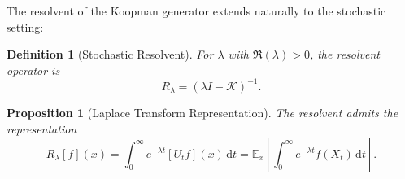 \documentclass[11pt,a4paper]{article}
\newtheorem{proposition}[theorem]{Proposition}
\newtheorem{definition}[theorem]{Definition}
\newcommand{\E}{\mathbb{E}}
\newcommand{\dt}{\,\mathrm{d}t}
\newcommand{\Koop}{\mathcal{K}}
\begin{document}
The resolvent of the Koopman generator extends naturally to the stochastic setting:

\begin{definition}[Stochastic Resolvent]\label{def:resolvent}
For $\lambda$ with $\Re(\lambda) > 0$, the resolvent operator is
\begin{equation}
R_\lambda = (\lambda I - \Koop)^{-1}.
\end{equation}
\end{definition}

\begin{proposition}[Laplace Transform Representation]\label{prop:laplace_resolvent}
The resolvent admits the representation
\begin{equation}\label{eq:resolvent_laplace}
R_\lambda[f](x) = \int_0^\infty e^{-\lambda t} [U_t f](x) \dt = \E_x\left[\int_0^\infty e^{-\lambda t} f(X_t) \dt\right].
\end{equation}
\end{proposition}
\end{document}
